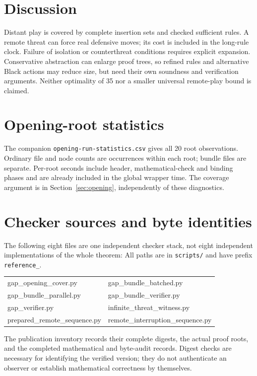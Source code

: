 \documentclass[11pt]{article}
\theoremstyle{definition}
\theoremstyle{remark}
\newcommand{\code}[1]{\texttt{#1}}
\begin{document}
\section{Discussion}
Distant play is covered by complete insertion sets and checked sufficient
rules. A remote threat can force real defensive moves; its cost is included
in the long-rule clock. Failure of isolation or counterthreat conditions
requires explicit expansion. Conservative abstraction can enlarge proof
trees, so refined rules and alternative Black actions may reduce size, but
need their own soundness and verification arguments.
Neither optimality of 35 nor a smaller universal remote-play bound is claimed.

\appendix

\section{Opening-root statistics}\label{app:stats}
The companion \code{opening-run-statistics.csv} gives all 20 root observations.
Ordinary file and node counts are occurrences within each root; bundle files
are separate. Per-root seconds include header, mathematical-check and binding
phases and are already included in the global wrapper time. The coverage
argument is in Section~\ref{sec:opening}, independently of these diagnostics.

\section{Checker sources and byte identities}
\label{app:sources}
The following eight files are one independent checker stack, not eight
independent implementations of the whole theorem:
All paths are in \code{scripts/} and have prefix \code{reference\_}.
\begin{center}\small\ttfamily
\begin{tabular}{@{}ll@{}}
gap\_opening\_cover.py & gap\_bundle\_batched.py\\
gap\_bundle\_parallel.py & gap\_bundle\_verifier.py\\
gap\_verifier.py & infinite\_threat\_witness.py\\
prepared\_remote\_sequence.py & remote\_interruption\_sequence.py
\end{tabular}\end{center}
The publication inventory records their complete digests, the actual proof
roots, and the completed mathematical and byte-audit records. Digest checks
are necessary for identifying the verified version; they do not authenticate
an observer or establish mathematical correctness by themselves.
\end{document}
